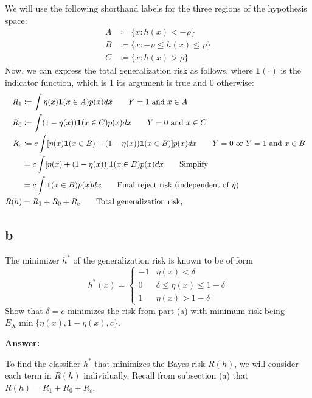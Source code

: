 \documentclass{article}
\begin{document}
We will use the following shorthand labels for the three regions of the hypothesis space:
\begin{align*}
    A &\coloneqq \{ x : h(x) < -\rho \} \\
    B &\coloneqq \{ x : -\rho \leq h(x) \leq \rho \} \\
    C &\coloneqq \{ x : h(x) > \rho \}
\end{align*}
Now, we can express the total generalization risk as follows, where \( \mathbf{1}(\cdot) \) is the indicator function, which is 1 its argument is true and 0 otherwise:
\begin{align*}
    R_1 &\coloneqq \int \eta(x) \mathbf{1}(x \in A) p(x) dx\tag*{\text{\( Y=1 \) and \( x \in A \)}} \\
    R_0 &\coloneqq \int (1 - \eta(x)) \mathbf{1}(x \in C) p(x) dx\tag*{\text{\( Y=0 \) and \( x \in C \)}} \\
    R_c &\coloneqq c \int \left[ \eta(x) \mathbf{1}(x \in B) + (1 - \eta(x)) \mathbf{1}(x \in B) \right] p(x) dx\tag*{\text{\( Y=0 \) or \( Y=1 \) and \( x \in B \) } } \\
    &= c \int \left[ \eta(x) + (1 - \eta(x)) \right] \mathbf{1}(x \in B) p(x) dx\tag*{\text{Simplify} } \\
    &= c \int \mathbf{1}(x \in B) p(x) dx\tag*{\text{Final reject risk (independent of $\eta$)} } \\
    R(h) &= R_1 + R_0 + R_c\tag*{\text{Total generalization risk,}}
\end{align*}

\subsection{b}
The minimizer $h^*$ of the generalization risk is known to be of form
\begin{equation*}
h^*(x) = \begin{cases}
    -1 & \eta(x) < \delta\\
    0 & \delta \leq \eta(x) \leq 1 - \delta\\
    1 & \eta(x) > 1 - \delta
    \end{cases}
\end{equation*}
Show that $\delta = c$ minimizes the risk from part (a) with minimum risk being $E_X\min\{\eta(x), 1 - \eta(x), c\}$.

\textbf{Answer:}

To find the classifier \( h^* \) that minimizes the Bayes risk \( R(h) \), we will consider each term in \( R(h) \) individually. Recall from subsection (a) that \( R(h) = R_1 + R_0 + R_c \).
\end{document}
